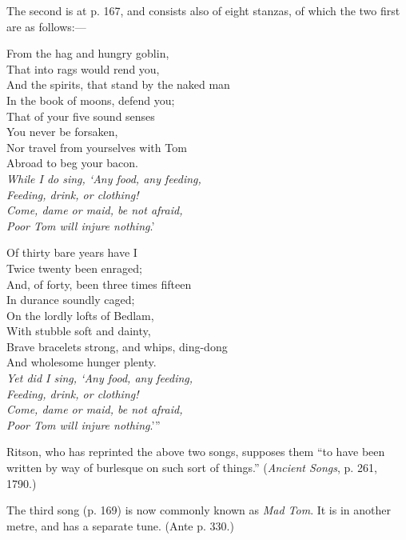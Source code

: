 The second is at p. 167, and consists also of eight stanzas, of which the two
first are as follows:—
\settowidth{\versewidth}{And the spirits, that stand by the naked man}
\begin{dcverse}\begin{altverse}
From the hag and hungry goblin,\\
That into rags would rend you, \\
And the spirits, that stand by the naked man\\
In the book of moons, defend you;\\
That of your five sound senses\\
You never be forsaken,\\
Nor travel from yourselves with Tom\\
Abroad to beg your bacon.\\
\textit{While I do sing, ‘Any food, any feeding,\\
Feeding, drink, or clothing!\\
Come, dame or maid, be not afraid,\\
Poor Tom will injure nothing}.’
\end{altverse}

\begin{altverse}
Of thirty bare years have I\\
Twice twenty been enraged;\\
And, of forty, been three times fifteen\\
In durance soundly caged;\\
On the lordly lofts of Bedlam,\\
With stubble soft and dainty,\\
Brave bracelets strong, and whips, ding-dong\\
And wholesome hunger plenty.\\
\textit{Yet did I sing, ‘Any food, any feeding,\\
Feeding, drink, or clothing!\\
Come, dame or maid, be not afraid,\\
Poor Tom will injure nothing}.’”
\end{altverse}
\end{dcverse}

Ritson, who has reprinted the above two songs, supposes them “to have been
written by way of burlesque on such sort of things.” (\textit{Ancient Songs}, p. 261, 1790.)
\pagebreak

The third song (p. 169) is now commonly known as \textit{Mad Tom}. It is in
another metre, and has a separate tune. (Ante p. 330.)

